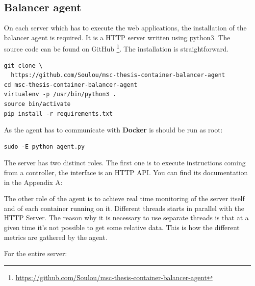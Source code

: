 \subsection{Balancer agent}

On each server which has to execute the web applications, the installation
of the balancer agent is required. It is a HTTP server written using python3.
The source code can be found on GitHub
\footnote{\url{https://github.com/Soulou/msc-thesis-container-balancer-agent}}. The
installation is straightforward.

\vspace{1em}
\begin{lstlisting}
git clone \
  https://github.com/Soulou/msc-thesis-container-balancer-agent
cd msc-thesis-container-balancer-agent
virtualenv -p /usr/bin/python3 .
source bin/activate
pip install -r requirements.txt
\end{lstlisting}

As the agent has to communicate with \textbf{Docker} is should be run as
root:

\vspace{1em}
\begin{lstlisting}
sudo -E python agent.py
\end{lstlisting}

The server has two distinct roles. The first one is to execute instructions
coming from a controller, the interface is an HTTP API. You can find its
documentation in the Appendix A: ~\nameref{app:agent-api}

The other role of the agent is to achieve real time monitoring of the
server itself and of each container running on it. Different threads
starts in parallel with the HTTP Server. The reason why it is necessary
to use separate threads is that at a given time it's not possible to
get some relative data. This is how the different metrics are gathered
by the agent.

For the entire server:

